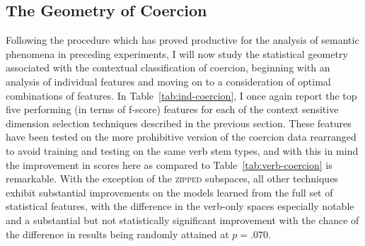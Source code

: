 \subsection{The Geometry of Coercion}
Following the procedure which has proved productive for the analysis of semantic phenomena in preceding experiments, I will now study the statistical geometry associated with the contextual classification of coercion, beginning with an analysis of individual features and moving on to a consideration of optimal combinations of features.  In Table~\ref{tab:ind-coercion}, I once again report the top five performing (in terms of f-score) features for each of the context sensitive dimension selection techniques described in the previous section.  These features have been tested on the more prohibitive version of the coercion data rearranged to avoid training and testing on the same verb stem types, and with this in mind the improvement in scores here as compared to Table~\ref{tab:verb-coercion} is remarkable.  With the exception of the \textsc{zipped} subspaces, all other techniques exhibit substantial improvements on the models learned from the full set of statistical features, with the difference in the verb-only spaces especially notable and a substantial but not statistically significant improvement with the chance of the difference in results being randomly attained at $p = .070$.

